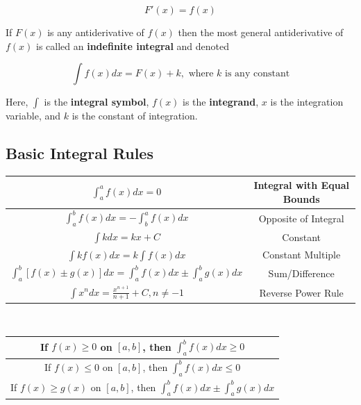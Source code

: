 \documentclass{article}
\begin{document}
            \begin{equation*}
                F'(x) = f(x)
            \end{equation*}

            \noindent If $F(x)$ is any antiderivative of $f(x)$ then the most general antiderivative
            of $f(x)$ is called an \textbf{indefinite integral} and denoted

            \begin{equation*}
                \int f(x)dx = F(x) + k,\text{    where $k$ is any constant}
            \end{equation*}

            \noindent Here, $\int$ is the \textbf{integral symbol}, $f(x)$ is the \textbf{integrand},
            $x$ is the integration variable, and $k$ is the constant of integration. \\



        \subsection{Basic Integral Rules}
            \begin{center}
                \begin{tabular}{|c|c|}
                    \hline
                    $\int^a_a f(x) dx = 0$ & Integral with Equal Bounds \\
                    \hline
                    $\int^b_a f(x)dx = -\int^a_b f(x)dx$ & Opposite of Integral \\
                    \hline
                    $\int k dx = kx + C$ & Constant \\
                    \hline
                    $\int kf(x)dx = k\int f(x)dx$ & Constant Multiple \\
                    \hline
                    $\int^b_a[f(x)\pm g(x)]dx = \int^b_a f(x)dx\pm\int^b_a g(x)dx$ & Sum/Difference \\
                    \hline
                    $\int x^n dx = \frac{x^{n+1}}{n+1}+C, n\not =-1$ & Reverse Power Rule \\
                    \hline
                \end{tabular}
            \end{center} \\

            \begin{center}
                \begin{tabular}{|c|}
                    \hline
                    If $f(x)\geq 0$ on $[a,b]$, then $\int^b_a f(x)dx\geq 0$  \\
                    \hline
                    If $f(x)\leq 0$ on $[a,b]$, then $\int^b_a f(x)dx\leq 0$  \\
                    \hline
                    If $f(x)\geq g(x)$ on $[a,b]$, then $\int^b_a f(x)dx\pm\int^b_a g(x)dx$  \\
                    \hline
                \end{tabular}
            \end{center}
\end{document}
